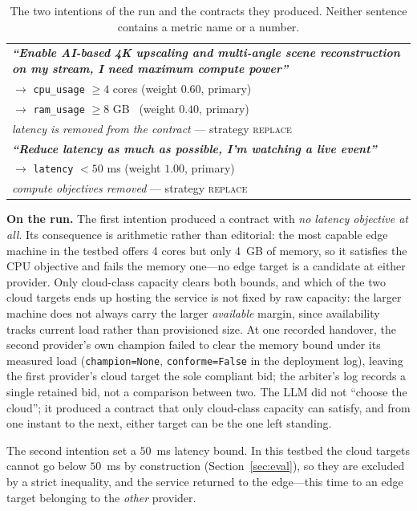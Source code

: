 \documentclass[conference]{IEEEtran}
\begin{document}
\begin{table}[t]
\centering
\caption{The two intentions of the run and the contracts they produced.
Neither sentence contains a metric name or a number.}
\label{tab:intents}
\footnotesize
\setlength{\tabcolsep}{4pt}
\begin{tabularx}{\columnwidth}{@{}X@{}}
\toprule
\textbf{\emph{``Enable AI-based 4K upscaling and multi-angle scene
reconstruction on my stream, I need maximum compute power''}}\\[2pt]
$\rightarrow$ \texttt{cpu\_usage} $\geq 4$ cores \quad (weight $0.60$,
primary)\\
$\rightarrow$ \texttt{ram\_usage} $\geq 8$ GB \quad\ (weight $0.40$,
primary)\\
\emph{latency is removed from the contract} --- strategy \textsc{replace}\\
\midrule
\textbf{\emph{``Reduce latency as much as possible, I'm watching a live
event''}}\\[2pt]
$\rightarrow$ \texttt{latency} $< 50$ ms \quad (weight $1.00$, primary)\\
\emph{compute objectives removed} --- strategy \textsc{replace}\\
\bottomrule
\end{tabularx}
\end{table}

\textbf{On the run.} The first intention produced a contract with \emph{no
latency objective at all}. Its consequence is arithmetic rather than
editorial: the most capable edge machine in the testbed offers 4 cores but
only 4~GB of memory, so it satisfies the CPU objective and fails the memory
one---no edge target is a candidate at either provider. Only cloud-class
capacity clears both bounds, and which of the two cloud targets ends up
hosting the service is not fixed by raw capacity: the larger machine does not
always carry the larger \emph{available} margin, since availability tracks
current load rather than provisioned size. At one recorded handover, the
second provider's own champion failed to clear the memory bound under its
measured load (\texttt{champion=None}, \texttt{conforme=False} in the
deployment log), leaving the first provider's cloud target the sole compliant
bid; the arbiter's log records a single retained bid, not a comparison
between two. The LLM did not ``choose the cloud''; it produced a contract
that only cloud-class capacity can satisfy, and from one instant to the next,
either target can be the one left standing.

The second intention set a $50$~ms latency bound. In this testbed the cloud
targets cannot go below $50$~ms by construction (Section~\ref{sec:eval}), so
they are excluded by a strict inequality, and the service returned to the
edge---this time to an edge target belonging to the \emph{other} provider.
\end{document}
